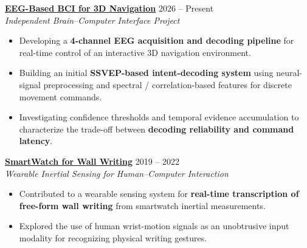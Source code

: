 \documentclass[10pt,letterpaper]{article}
\begin{document}

\noindent
\textbf{
\href{https://satyam-aw.github.io/projects/bci_maze/}
{EEG-Based BCI for 3D Navigation}}
\hfill 2026 -- Present
\\
\textit{Independent Brain--Computer Interface Project}

\begin{itemize}

    \item Developing a
    \textbf{4-channel EEG acquisition and decoding pipeline}
    for real-time control of an interactive 3D navigation environment.

    \item Building an initial
    \textbf{SSVEP-based intent-decoding system}
    using neural-signal preprocessing and
    spectral / correlation-based features
    for discrete movement commands.

    \item Investigating confidence thresholds and temporal evidence
    accumulation to characterize the trade-off between
    \textbf{decoding reliability and command latency}.

\end{itemize}


\noindent
\textbf{
\href{https://doi.org/10.1109/COMSNETS53615.2022.9668531}
{SmartWatch for Wall Writing}}
\hfill 2019 -- 2022
\\
\textit{Wearable Inertial Sensing for Human--Computer Interaction}

\begin{itemize}

    \item Contributed to a wearable sensing system for
    \textbf{real-time transcription of free-form wall writing}
    from smartwatch inertial measurements.

    \item Explored the use of human wrist-motion signals as an
    unobtrusive input modality for recognizing physical writing gestures.

\end{itemize}

\end{document}
